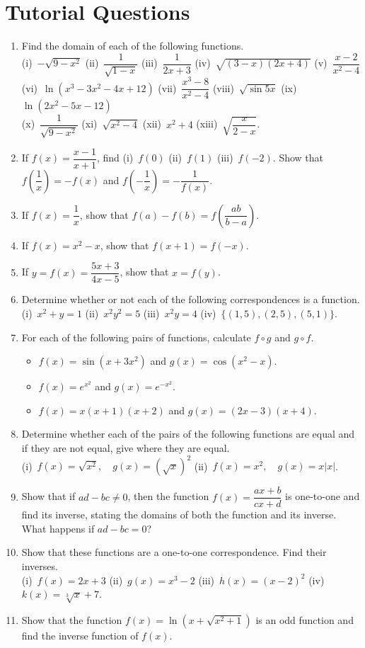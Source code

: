 \documentclass[titlepage,a4paper,12pt]{report}
\begin{document}
\section{Tutorial Questions}
\begin{enumerate}
\item Find the domain of each of the following functions.\\
(i)\, $-\sqrt{9-x^2}$  \quad (ii)\, $\dfrac{1}{\sqrt{1-x}}$ \quad (iii)\, $\dfrac{1}{2x+3}$ \quad (iv)\, $\sqrt{(3-x)(2x+4)}$ \quad (v)\, $\dfrac{x-2}{x^2-4}$ \\ (vi)\, $\ln (x^3-3x^2-4x+12)$ \quad (vii)\, $\dfrac{x^3-8}{x^2-4}$ \quad (viii)\, $\sqrt{\sin 5x}$ \quad  (ix)\, $\ln (2x^2-5x-12)$ \\(x)\, $\dfrac{1}{\sqrt{9-x^2}}$ \quad (xi)\, $\sqrt{x^2-4}$ \quad (xii)\, $x^2+4$ \quad (xiii)\, $\sqrt{\dfrac{x}{2-x}}$.
\item If $f(x)=\dfrac{x-1}{x+1}$, find (i)\, $f(0)$ \quad (ii)\, $f(1)$ \quad (iii)\, $f(-2)$. Show that $f\left(\dfrac{1}{x}\right)=-f(x)$ and $f\left(-\dfrac{1}{x}\right)=-\dfrac{1}{f(x)}$.
\item If $f(x)=\dfrac{1}{x}$, show that $f(a)-f(b)=f\left(\dfrac{ab}{b-a} \right)$.
\item If $f(x)=x^2-x$, show that $f(x+1)=f(-x)$.
\item If $y=f(x)=\dfrac{5x+3}{4x-5}$, show that $x=f(y)$.
\item Determine whether or not each of the following correspondences is a function.\\
(i)\, $x^2+y=1$ \quad (ii)\, $x^2y^2=5$ \quad (iii)\, $x^2y=4$ \quad (iv)\, $\{(1,5), (2,5), (5,1)\}$.
\item For each of the following pairs of functions, calculate $f\circ g$ and $g\circ f$.
\begin{itemize}
\item[(i)] $f(x)=\sin (x+3x^2)$ and $g(x)=\cos (x^2-x)$.
\item[(ii)] $f(x)=e^{x^2}$ and $g(x)=e^{-x^2}$.
\item[(iii)] $f(x)=x(x+1)(x+2)$ and $g(x)=(2x-3)(x+4)$.
\end{itemize}
\item Determine whether each of the pairs of the following functions are equal and if they are not equal, give where they are equal.\\
(i)\, $f(x)=\sqrt{x^2}, \quad g(x)=(\sqrt{x})^2$ \quad (ii)\, $f(x)=x^2, \quad g(x)=x|x|$.
\item Show that if $ad-bc\neq 0$, then the function $f(x)=\dfrac{ax+b}{cx+d}$ is one-to-one and find its inverse, stating the domains of both the function and its inverse. What happens if $ad-bc=0$?
\item Show that these functions are a one-to-one correspondence. Find their inverses.\\
(i)\, $f(x)=2x+3$ \quad (ii)\, $g(x)=x^3-2$ \quad (iii)\, $h(x)=(x-2)^2$ \quad (iv)\, $k(x)=\sqrt[3]{x}+7$.
\item Show that the function $f(x)=\ln (x+\sqrt{x^2+1})$ is an odd function and find the inverse function of $f(x)$.
\end{enumerate}
\end{document}
